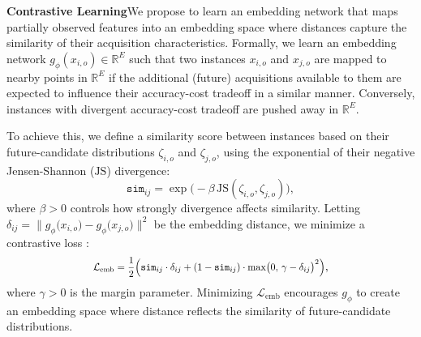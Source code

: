 
\textbf{Contrastive Learning}\quad We propose to learn an embedding network that maps partially observed features into an embedding space where distances capture the similarity of their acquisition characteristics. Formally, we learn an embedding network $g_\phi(x_{i,o}) \in \mathbb{R}^E$ such that two instances $x_{i,o}$ and $x_{j,o}$ are mapped to nearby points in $\mathbb{R}^E$ if the additional (future) acquisitions available to them are expected to influence their accuracy-cost tradeoff in a similar manner. Conversely, instances with divergent accuracy-cost tradeoff are pushed away in $\mathbb{R}^E$. 

To achieve this, we define a similarity score between instances based on their future-candidate distributions $\zeta_{i, o}$ and $\zeta_{j, o}$, using the exponential of their negative Jensen-Shannon ($\mathrm{JS}$) divergence:
\begin{equation}
      \texttt{sim}_{ij}
    = \exp\!\bigl(-\beta\,\mathrm{JS}(\zeta_{i, o}, \zeta_{j, o})\bigr),
    \label{eq:js}
\end{equation}
where $\beta > 0$ controls how strongly divergence affects similarity. Letting $\delta_{ij} = \bigl\lVert g_\phi \bigl(x_{i,o}\bigr) - g_\phi\bigl(x_{j, o}\bigr)\bigr\rVert^2$ be the embedding distance, we minimize a contrastive loss \citep{chopra2005learning}:
\begin{equation}
\label{eq:ebmedding}
    \scalebox{0.87}{$\displaystyle
    \mathcal{L}_{\mathrm{emb}} = \frac{1}{2} \Bigl(\texttt{sim}_{ij} \cdot \delta_{ij} + 
    (1 - \texttt{sim}_{ij}) \cdot \max \bigl(0,\,\gamma - \delta_{ij}\bigr)^2\Bigr)$},
\end{equation} 
where $\gamma > 0$ is the margin parameter. Minimizing $\mathcal{L}_{\mathrm{emb}}$ encourages $g_\phi$ to create an embedding space where distance reflects the similarity of future-candidate distributions. 

